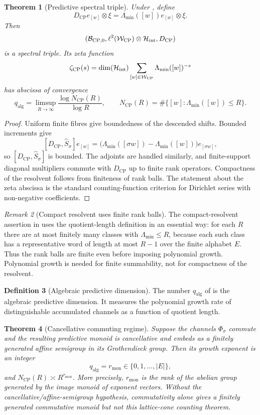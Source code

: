 \documentclass[11pt]{article}
\newtheorem{theorem}{Theorem}[section]
\theoremstyle{definition}
\newtheorem{definition}[theorem]{Definition}
\theoremstyle{remark}
\newtheorem{remark}[theorem]{Remark}
\newcommand{\B}{\mathcal{B}}
\newcommand{\Hh}{\mathcal{H}}
\newcommand{\W}{\mathcal{W}}
\newcommand{\CP}{\mathrm{CP}}
\newcommand{\qalg}{q_{\mathrm{alg}}}
\newcommand{\rmon}{r_{\mathrm{mon}}}
\newcommand{\Lam}{\Lambda}
\begin{document}
\begin{theorem}[Predictive spectral triple]
\label{thm:triple}
Under , define
\[
 D_{\CP}e_{[w]}\otimes\xi=\Lam_{\min}([w])e_{[w]}\otimes\xi.
\]
Then
\[
 (\B_{\CP,0},\ell^2(\W_{\CP})\otimes\Hh_{\rm int},D_{\CP})
\]
is a spectral triple.  Its zeta function
\[
 \zeta_{\CP}(s)=\dim(\Hh_{\rm int})\sum_{[w]\in\W_{\CP}}\Lam_{\min}([w])^{-s}
\]
has abscissa of convergence
\[
 \qalg=\limsup_{R\to\infty}\frac{\log N_{\CP}(R)}{\log R},\qquad
 N_{\CP}(R)=\#\{[w]:\Lam_{\min}([w])\le R\}.
\]
\end{theorem}

\begin{proof}
Uniform finite fibres give boundedness of the descended shifts.  Bounded increments give
\[
 [D_{\CP},\widehat S_\sigma]e_{[w]}
 =\bigl(\Lam_{\min}([\sigma w])-\Lam_{\min}([w])\bigr)e_{[\sigma w]},
\]
so $[D_{\CP},\widehat S_\sigma]$ is bounded.  The adjoints are handled similarly, and finite-support diagonal multipliers commute with $D_{\CP}$ up to finite rank operators.  Compactness of the resolvent follows from finiteness of rank balls.  The statement about the zeta abscissa is the standard counting-function criterion for Dirichlet series with non-negative coefficients.
\end{proof}

\begin{remark}[Compact resolvent uses finite rank balls]
\label{rem:compact-resolvent-finite-balls}
The compact-resolvent assertion in  uses the quotient-length
definition in an essential way: for each $R$ there are at most finitely many
classes with $\Lam_{\min}\le R$, because each such class has a representative
word of length at most $R-1$ over the finite alphabet $E$.  Thus the rank balls
are finite even before imposing polynomial growth.  Polynomial growth is needed
for finite summability, not for compactness of the resolvent.
\end{remark}

\begin{definition}[Algebraic predictive dimension]
\label{def:qalg}
The number $\qalg$ of  is the algebraic predictive dimension.  It measures the polynomial growth rate of distinguishable accumulated channels as a function of quotient length.
\end{definition}

\begin{theorem}[Cancellative commuting regime]
\label{thm:commuting}
Suppose the channels $\Phi_\sigma$ commute and the resulting predictive monoid is
cancellative and embeds as a finitely generated affine semigroup in its
Grothendieck group.  Then its growth exponent is an integer
\[
 \qalg=\rmon\in\{0,1,\ldots,|E|\},
\]
and $N_{\CP}(R)\asymp R^{\rmon}$.  More precisely, $\rmon$ is the rank of the
abelian group generated by the image monoid of exponent vectors.  Without the
cancellative/affine-semigroup hypothesis, commutativity alone gives a finitely
generated commutative monoid but not this lattice-cone counting theorem.
\end{theorem}
\end{document}
